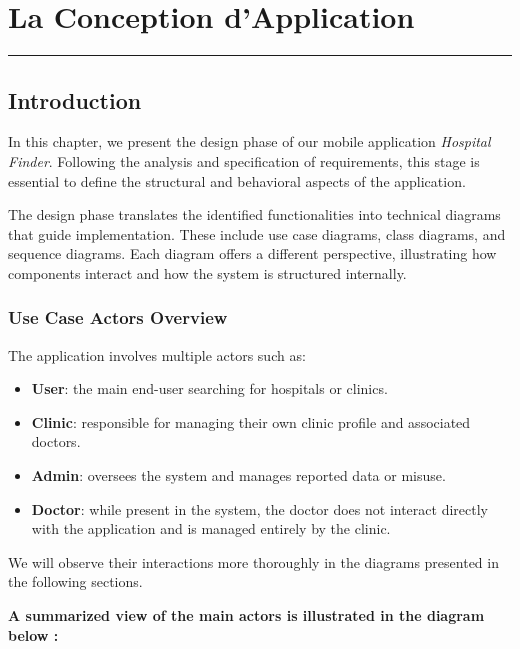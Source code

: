 \documentclass[12pt]{report}
\begin{document}
\newpage

\chapter{\textbf{La Conception d'Application}}
\rule{\linewidth}{1.5pt}


\section{\textbf{Introduction}}

\noindent In this chapter, we present the design phase of our mobile application \textit{Hospital Finder}. Following the analysis and specification of requirements, this stage is essential to define the structural and behavioral aspects of the application.

\noindent The design phase translates the identified functionalities into technical diagrams that guide implementation. These include use case diagrams, class diagrams, and sequence diagrams. Each diagram offers a different perspective, illustrating how components interact and how the system is structured internally.

\subsection{Use Case Actors Overview}

\noindent The application involves multiple actors such as:

\begin{itemize}
	\item \textbf{User}: the main end-user searching for hospitals or clinics.
	\item \textbf{Clinic}: responsible for managing their own clinic profile and associated doctors.
	\item \textbf{Admin}: oversees the system and manages reported data or misuse.
	\item \textbf{Doctor}: while present in the system, the doctor does not interact directly with the application and is managed entirely by the clinic.
\end{itemize}
\newpage
\noindent We will observe their interactions more thoroughly in the diagrams presented in the following sections.

\noindent \textbf{A summarized view of the main actors is illustrated in the diagram below :}
\end{document}
